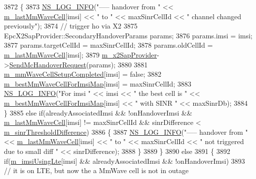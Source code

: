 \begin{DoxyCode}
3872     \{
3873       \hyperlink{group__logging_gafbd73ee2cf9f26b319f49086d8e860fb}{NS\_LOG\_INFO}(\textcolor{stringliteral}{"----- handover from "} << \hyperlink{classns3_1_1LteEnbRrc_a0d7b04f0383b0dc3f6a7360b87cbaeee}{m\_lastMmWaveCell}[imsi] << \textcolor{stringliteral}{" to "} << 
      maxSinrCellId << \textcolor{stringliteral}{" channel changed previously"});
3874       \textcolor{comment}{// trigger ho via X2}
3875       EpcX2SapProvider::SecondaryHandoverParams params;
3876       params.imsi = imsi;
3877       params.targetCellId = maxSinrCellId;
3878       params.oldCellId = \hyperlink{classns3_1_1LteEnbRrc_a0d7b04f0383b0dc3f6a7360b87cbaeee}{m\_lastMmWaveCell}[imsi];
3879       \hyperlink{classns3_1_1LteEnbRrc_ae8dc75f4f6f63b7736d86204a4beb415}{m\_x2SapProvider}->\hyperlink{classns3_1_1EpcX2SapProvider_a419d10f3f7f1808938a53439bed4f9eb}{SendMcHandoverRequest}(params);
3880 
3881       \hyperlink{classns3_1_1LteEnbRrc_ad19d6f4c123115e1d13e34609781ab20}{m\_mmWaveCellSetupCompleted}[imsi] = \textcolor{keyword}{false};
3882       \hyperlink{classns3_1_1LteEnbRrc_a38d5bf3d53b16596824f07d4b4a1eab7}{m\_bestMmWaveCellForImsiMap}[imsi] = maxSinrCellId;
3883       \hyperlink{group__logging_gafbd73ee2cf9f26b319f49086d8e860fb}{NS\_LOG\_INFO}(\textcolor{stringliteral}{"For imsi "} << imsi << \textcolor{stringliteral}{" the best cell is "} << 
      \hyperlink{classns3_1_1LteEnbRrc_a38d5bf3d53b16596824f07d4b4a1eab7}{m\_bestMmWaveCellForImsiMap}[imsi] << \textcolor{stringliteral}{" with SINR "} << maxSinrDb);
3884     \} 
3885     \textcolor{keywordflow}{else} \textcolor{keywordflow}{if}(alreadyAssociatedImsi && !onHandoverImsi && \hyperlink{classns3_1_1LteEnbRrc_a0d7b04f0383b0dc3f6a7360b87cbaeee}{m\_lastMmWaveCell}[imsi] != 
      maxSinrCellId && sinrDifference < \hyperlink{classns3_1_1LteEnbRrc_aef56a65c644f6ed3c5f28a540ded624f}{m\_sinrThresholdDifference})
3886     \{
3887       \hyperlink{group__logging_gafbd73ee2cf9f26b319f49086d8e860fb}{NS\_LOG\_INFO}(\textcolor{stringliteral}{"----- handover from "} << \hyperlink{classns3_1_1LteEnbRrc_a0d7b04f0383b0dc3f6a7360b87cbaeee}{m\_lastMmWaveCell}[imsi] << \textcolor{stringliteral}{" to "} << 
      maxSinrCellId << \textcolor{stringliteral}{" not triggered due to small diff "} << sinrDifference);
3888     \}
3889   \}
3890   \textcolor{keywordflow}{else}
3891   \{
3892     \textcolor{keywordflow}{if}(\hyperlink{classns3_1_1LteEnbRrc_a99427e888b10d095491e72bf062511db}{m\_imsiUsingLte}[imsi] && alreadyAssociatedImsi && !onHandoverImsi) 
3893     \textcolor{comment}{// it is on LTE, but now the a MmWave cell is not in outage}

\end{DoxyCode}
